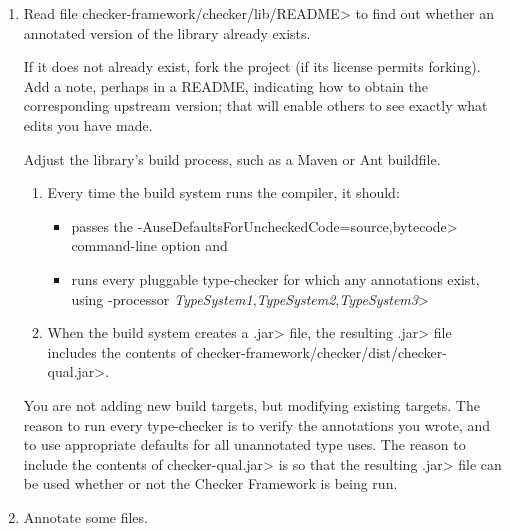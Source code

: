 \begin{enumerate}
\item Read file \<checker-framework/checker/lib/README>
  to find out whether an annotated version of the library already exists.

  If it does not already exist, fork the project (if its license permits
  forking).  Add a note, perhaps in a README, indicating how to obtain the
  corresponding upstream version; that will enable others to see exactly
  what edits you have made.

  Adjust the library's
  build process, such as a Maven or Ant buildfile.
  \begin{sloppypar}
  \begin{enumerate}
  \item
    Every time the build system runs the compiler, it should:
    \begin{itemize}
    \item
      passes the \<-AuseDefaultsForUncheckedCode=source,bytecode>
      command-line option and
    \item
      runs every pluggable type-checker for which any
      annotations exist, using \<-processor
      \emph{TypeSystem1},\emph{TypeSystem2},\emph{TypeSystem3}>
    \end{itemize}
  \item
    When the build system creates a \<.jar> file, the resulting \<.jar>
    file includes the contents of
    \<checker-framework/checker/dist/checker-qual.jar>.
  \end{enumerate}
  \end{sloppypar}

  You are not adding new build targets, but modifying existing targets.
  The reason to run every type-checker is to verify
  the annotations you wrote, and to use appropriate defaults for all
  unannotated type uses.
  The reason to include the contents of \<checker-qual.jar> is so that
  the resulting \<.jar> file can be used whether or not the Checker Framework
  is being run.

\item Annotate some files.


\end{enumerate}
